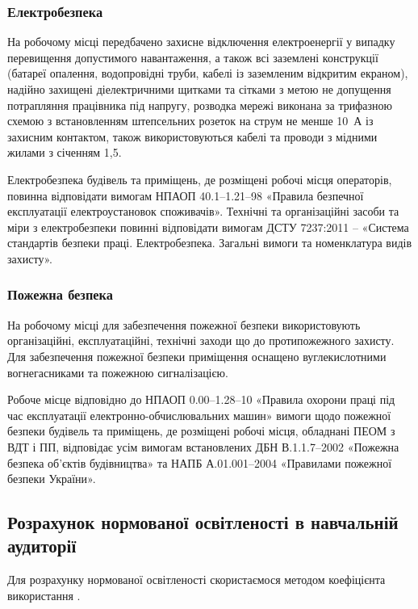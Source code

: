 \documentclass[a4paper,ukrainian,utf8,nocolumnsxix,floatsection,equationsection]{eskdtext}
\renewcommand\paragraph{\subsubsection}
\begin{document}
\paragraph{Електробезпека}

На робочому місці передбачено захисне відключення електроенергії у випадку перевищення допустимого навантаження, а також всі заземлені конструкції (батареї опалення,  водопровідні труби, кабелі із заземленим відкритим екраном), надійно захищені діелектричними щитками та сітками з метою не допущення потрапляння працівника під напругу, розводка мережі виконана за трифазною схемою з встановленням штепсельних розеток на струм не менше 10~А із захисним контактом, також використовуються кабелі та проводи з мідними жилами з січенням 1,5.

Електробезпека будівель та приміщень, де розміщені робочі місця операторів, повинна відповідати вимогам НПАОП 40.1–1.21–98 «Правила безпечної експлуатації електроустановок споживачів». Технічні та організаційні засоби та міри з електробезпеки повинні відповідати вимогам ДСТУ 7237:2011 – «Система стандартів безпеки праці. Електробезпека. Загальні вимоги та номенклатура видів захисту».

\paragraph{Пожежна безпека}

На робочому місці для забезпечення пожежної безпеки використовують організаційні, експлуатаційні, технічні заходи що до протипожежного захисту. Для забезпечення пожежної безпеки  приміщення оснащено вуглекислотними вогнегасниками та пожежною сигналізацією.

Робоче місце відповідно до НПАОП 0.00–1.28–10 «Правила охорони праці під час експлуатації електронно-обчислювальних машин» вимоги  щодо пожежної безпеки будівель та приміщень, де розміщені робочі місця, обладнані ПЕОМ з ВДТ і ПП, відповідає усім вимогам встановлених ДБН В.1.1.7–2002 «Пожежна безпека  об'єктів будівництва» та НАПБ А.01.001–2004 «Правилами пожежної безпеки України».

\subsection{Розрахунок нормованої освітленості в навчальній аудиторії}

Для розрахунку нормованої освітленості скористаємося методом коефіцієнта використання \cite{work:safety:18}.
\end{document}
